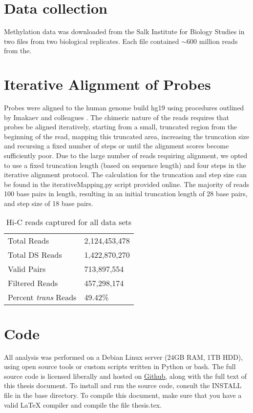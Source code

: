 
\chapter{Data collection}

Methylation data was downloaded from the Salk Institute for Biology Studies in
two files from two biological replicates.  Each file contained $\sim600$ million
reads from the.

\chapter{Iterative Alignment of Probes}

Probes were aligned to the human genome build hg19 using procedures outlined by Imakaev and colleagues \citep{imakaev2012}.  The chimeric nature of the reads
requires that probes be aligned iteratively, starting from a small, truncated region from the beginning of the read, mapping this truncated area, increasing
the truncation size and recursing a fixed number of steps or until the alignment scores become sufficiently poor.  Due to the large number of reads requiring
alignment, we opted to use a fixed truncation length (based on sequence length) and four steps in the iterative alignment protocol.  The calculation
for the truncation and step size can be found in the iterativeMapping.py script provided online.  The majority of reads 100 base pairs in length, resulting
in an initial truncation length of 28 base pairs, and step size of 18 base pairs.

\begin{table}[ht]
  \centering
  \caption{Hi-C reads captured for all data sets}\label{tab:reads}
  \begin{tabular}{l l}
    \toprule
    Total Reads                  & 2,124,453,478 \\
    Total DS Reads               & 1,422,870,270 \\
    Valid Pairs                  & 713,897,554 \\
    Filtered Reads               & 457,298,174 \\
    Percent \textit{trans} Reads & 49.42\% \\
    \bottomrule
  \end{tabular}
\end{table}

\chapter{Code}

All analysis was performed on a Debian Linux server (24GB RAM, 1TB HDD), using open source tools or custom scripts written in Python or bash.
The full source code is licensed liberally and hosted on \href{https://github.com/New-College-of-Florida/Jonathan-Niles-Thesis}{\underline{Github}},
along with the full text of this thesis document.  To install and run the source code, consult the INSTALL file in the base directory.  To
compile this document, make sure that you have a valid \LaTeX{} compiler and compile the file thesis.tex.
